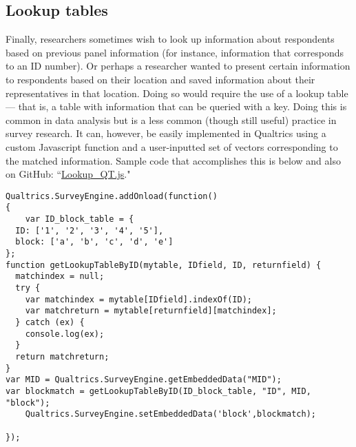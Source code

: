 \documentclass[12pt]{article}
\begin{document}
\subsection{Lookup tables}
Finally, researchers sometimes wish to look up information about respondents based on previous panel information (for instance, information that corresponds to an ID number). Or perhaps a researcher wanted to present certain information to respondents based on their location and saved information about their representatives in that location. Doing so would require the use of a lookup table --- that is, a table with information that can be queried with a key. Doing this is common in data analysis but is a less common (though still useful) practice in survey research. It can, however, be easily implemented in Qualtrics using a custom Javascript function and a user-inputted set of vectors corresponding to the matched information. Sample code that accomplishes this is below and also on GitHub: ``\href{https://github.com/justindbk/qualtrics-javascript}{Lookup\_QT.js}."

\begin{verbatim}
Qualtrics.SurveyEngine.addOnload(function()
{
	var ID_block_table = {
  ID: ['1', '2', '3', '4', '5'],
  block: ['a', 'b', 'c', 'd', 'e']
};
function getLookupTableByID(mytable, IDfield, ID, returnfield) {
  matchindex = null;
  try {
    var matchindex = mytable[IDfield].indexOf(ID);
	var matchreturn = mytable[returnfield][matchindex];
  } catch (ex) {
    console.log(ex);
  }
  return matchreturn;
}
var MID = Qualtrics.SurveyEngine.getEmbeddedData("MID");
var blockmatch = getLookupTableByID(ID_block_table, "ID", MID, "block");
	Qualtrics.SurveyEngine.setEmbeddedData('block',blockmatch);

});
\end{verbatim}



\end{document}
